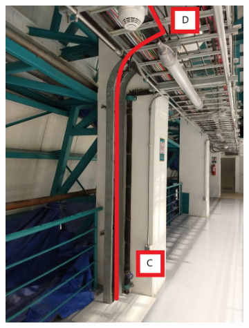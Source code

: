 \begin{figure}
  \centering
  \begin{subfigure}{0.30\textwidth}
    \centering
    \includegraphics[width=\textwidth]{images/14.jpg}
  \end{subfigure}
  \hfill
  \begin{subfigure}{0.30\textwidth}
    \centering

\end{subfigure}
\end{figure}
